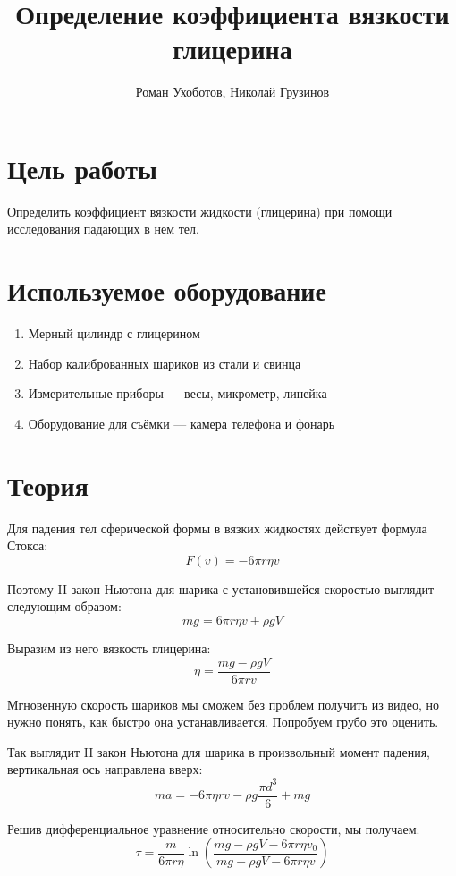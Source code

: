 \documentclass[a4paper, 12pt]{article}
\title{Определение коэффициента вязкости глицерина}
\author{Роман Ухоботов, Николай Грузинов}
\date{}%
\begin{document}
    \maketitle


    \section{Цель работы}\label{sec:target}
    Определить коэффициент вязкости жидкости (глицерина) при помощи исследования падающих в нем тел.


    \section{Используемое оборудование}\label{sec:tools}
    \begin{enumerate}
        \item Мерный цилиндр с глицерином
        \item Набор калиброванных шариков из стали и свинца
        \item Измерительные приборы --- весы, микрометр, линейка
        \item Оборудование для съёмки --- камера телефона и фонарь
    \end{enumerate}


    \section{Теория}\label{sec:theory}

    Для падения тел сферической формы в вязких жидкостях действует формула Стокса:
    \[F(v) = -6 \pi r \eta v\]

    Поэтому II закон Ньютона для шарика с установившейся скоростью выглядит следующим образом:
    \[m g = 6 \pi r \eta v + \rho g V\]

    Выразим из него вязкость глицерина:
    \[ \eta = \frac{m g - \rho g V}{6 \pi r v} \]

    Мгновенную скорость шариков мы сможем без проблем получить из видео, но нужно понять,
    как быстро она устанавливается.
    Попробуем грубо это оценить.

    Так выглядит II закон Ньютона для шарика в произвольный момент падения, вертикальная ось направлена вверх:
    \[ ma = - 6 \pi \eta r v - \rho g \frac{\pi d^3}{6} + mg \]

    Решив дифференциальное уравнение относительно скорости, мы получаем:
    \[ \tau = \frac{m}{6\pi r\eta}\ln\left( \frac{mg - \rho gV - 6\pi r\eta v_0}{mg - \rho gV - 6\pi r\eta v} \right) \]
\end{document}
